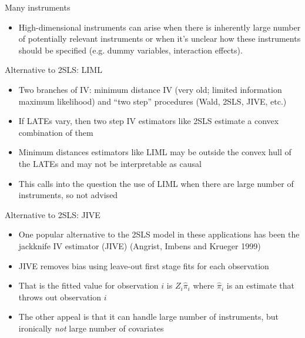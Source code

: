\documentclass{beamer}
\begin{document}
\begin{frame}{Many instruments}

\begin{itemize}

\item High-dimensional instruments can arise when there is inherently large number of potentially relevant instruments or when it’s unclear how these instruments should be specified (e.g. dummy variables, interaction effects).
\end{itemize}

\end{frame}



\begin{frame}{Alternative to 2SLS: LIML}

\begin{itemize}
\item Two branches of IV: minimum distance IV (very old; limited information maximum likelihood) and ``two step'' procedures (Wald, 2SLS, JIVE, etc.)
\item If LATEs vary, then two step IV estimators like 2SLS estimate a convex combination of them
\item Minimum distances estimators like LIML may be outside the convex hull of the LATEs and may not be interpretable as causal
\item This calls into the question the use of LIML when there are large number of instruments, so not advised
\end{itemize}

\end{frame}

\begin{frame}{Alternative to 2SLS: JIVE}

\begin{itemize}
\item One popular alternative to the 2SLS model in these applications has been the jackknife IV estimator (JIVE) (Angrist, Imbens and Krueger 1999)

\item JIVE removes bias using leave-out first stage fits for each observation 

\item That is the fitted value for observation $i$ is $Z_i\widehat{\pi}_{i}$ where $\widehat{\pi}_i$ is an estimate that throws out observation $i$

\item The other appeal is that it can handle large number of instruments, but ironically \emph{not} large number of covariates

\end{itemize}

\end{frame}
\end{document}
